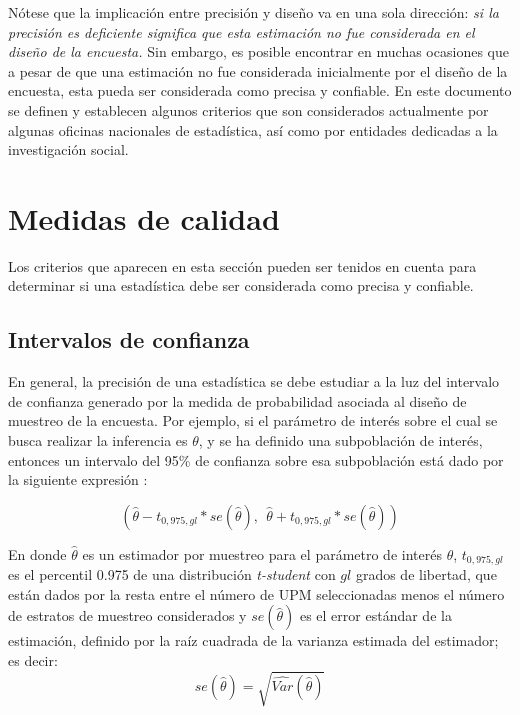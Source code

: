 \documentclass[
  12pt,
  spanish,
]{book}
\begin{document}
Nótese que la implicación entre precisión y diseño va en una sola dirección: \emph{si la precisión es deficiente significa que esta estimación no fue considerada en el diseño de la encuesta.} Sin embargo, es posible encontrar en muchas ocasiones que a pesar de que una estimación no fue considerada inicialmente por el diseño de la encuesta, esta pueda ser considerada como precisa y confiable. En este documento se definen y establecen algunos criterios que son considerados actualmente por algunas oficinas nacionales de estadística, así como por entidades dedicadas a la investigación social.

\hypertarget{medidas-de-calidad}{%
\section{Medidas de calidad}\label{medidas-de-calidad}}

Los criterios que aparecen en esta sección pueden ser tenidos en cuenta para determinar si una estadística debe ser considerada como precisa y confiable.

\hypertarget{intervalos-de-confianza}{%
\subsection{Intervalos de confianza}\label{intervalos-de-confianza}}

En general, la precisión de una estadística se debe estudiar a la luz del intervalo de confianza generado por la medida de probabilidad asociada al diseño de muestreo de la encuesta. Por ejemplo, si el parámetro de interés sobre el cual se busca realizar la inferencia es \(\theta\), y se ha definido una subpoblación de interés, entonces un intervalo del 95\% de confianza sobre esa subpoblación está dado por la siguiente expresión \citep{Heeringa_West_Berglund_2010}:

\[
(\hat\theta - t_{0,975, gl} * se(\hat\theta), \ \ \hat\theta + t_{0,975, gl} * se(\hat\theta))
\]

En donde \(\hat\theta\) es un estimador por muestreo para el parámetro de interés \(\theta\), \(t_{0,975, gl}\) es el percentil 0.975 de una distribución \emph{t-student} con \(gl\) grados de libertad, que están dados por la resta entre el número de UPM seleccionadas menos el número de estratos de muestreo considerados y \(se(\hat\theta)\) es el error estándar de la estimación, definido por la raíz cuadrada de la varianza estimada del estimador; es decir:
\[
se(\hat\theta) = \sqrt{\widehat{Var}(\hat\theta)}
\]
\end{document}
